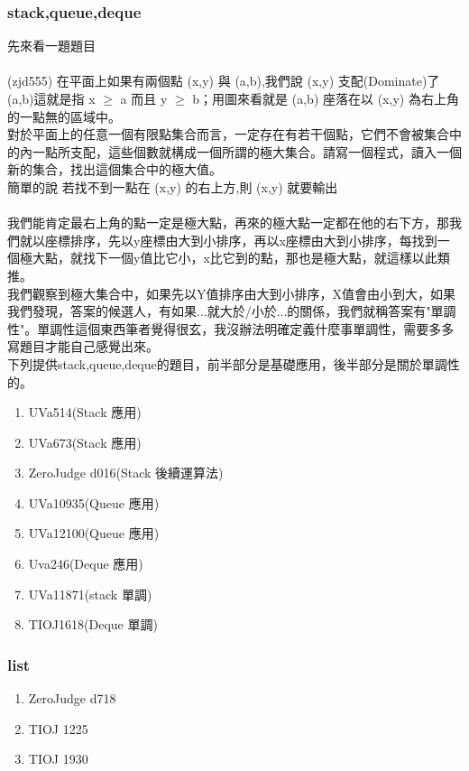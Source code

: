 \subsubsection{stack,queue,deque}
先來看一題題目\\ \\
(zjd555)
在平面上如果有兩個點 (x,y) 與 (a,b),我們說 (x,y) 支配(Dominate)了(a,b)這就是指 x $\geq$ a
而且 y $\geq$ b；用圖來看就是 (a,b) 座落在以 (x,y) 為右上角的一點無的區域中。\\ 
對於平面上的任意一個有限點集合而言，一定存在有若干個點，它們不會被集合中的內一點所支配，這些個數就構成一個所謂的極大集合。請寫一個程式，讀入一個新的集合，找出這個集合中的極大值。\\
簡單的說  若找不到一點在 (x,y) 的右上方,則 (x,y) 就要輸出\\ \\
我們能肯定最右上角的點一定是極大點，再來的極大點一定都在他的右下方，那我們就以座標排序，先以y座標由大到小排序，再以x座標由大到小排序，每找到一個極大點，就找下一個y值比它小，x比它到的點，那也是極大點，就這樣以此類推。\\
我們觀察到極大集合中，如果先以Y值排序由大到小排序，X值會由小到大，如果我們發現，答案的候選人，有如果...就大於/小於...的關係，我們就稱答案有"單調性"。單調性這個東西筆者覺得很玄，我沒辦法明確定義什麼事單調性，需要多多寫題目才能自己感覺出來。\\
下列提供stack,queue,deque的題目，前半部分是基礎應用，後半部分是關於單調性的。
\begin{enumerate}
\item UVa514(Stack 應用)
\item UVa673(Stack 應用)
\item ZeroJudge d016(Stack 後續運算法)
\item UVa10935(Queue 應用)
\item UVa12100(Queue 應用)
\item Uva246(Deque 應用)
\item UVa11871(stack 單調)
\item TIOJ1618(Deque 單調)
\end{enumerate}
\subsubsection{list}
\begin{enumerate}
\item ZeroJudge d718
\item TIOJ 1225
\item TIOJ 1930
\end{enumerate}
